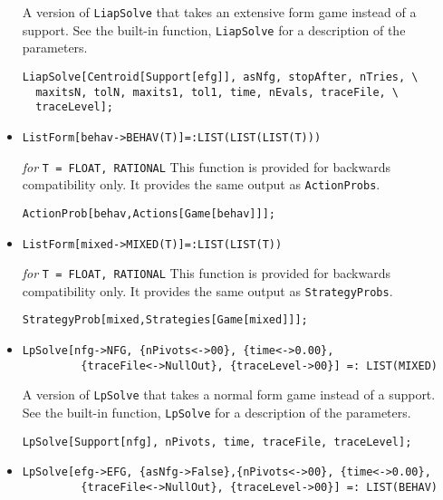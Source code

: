 \begin{itemize}
\bd 
A version of \verb+LiapSolve+ that takes an extensive form
game instead of a support.  See the built-in function,
\verb+LiapSolve+ for a description of the parameters.
\begin{verbatim}
LiapSolve[Centroid[Support[efg]], asNfg, stopAfter, nTries, \
  maxitsN, tolN, maxits1, tol1, time, nEvals, traceFile, \
  traceLevel];
\end{verbatim} 
\ed

\item{}
\protect \large \begin{verbatim}
ListForm[behav->BEHAV(T)]=:LIST(LIST(LIST(T)))
\end{verbatim}\normalsize

{\it for} {\tt T = FLOAT, RATIONAL}
\bd 
This function is provided for backwards compatibility only.  It
provides the same output as \verb+ActionProbs+.
\begin{verbatim}
ActionProb[behav,Actions[Game[behav]]];
\end{verbatim} 
\ed

\item{}
\protect \large \begin{verbatim}
ListForm[mixed->MIXED(T)]=:LIST(LIST(T))
\end{verbatim}\normalsize

{\it for} {\tt T = FLOAT, RATIONAL}
\bd 
This function is provided for backwards compatibility only.  It
provides the same output as \verb+StrategyProbs+.
\begin{verbatim}
StrategyProb[mixed,Strategies[Game[mixed]]];
\end{verbatim} 
\ed

\item{}
\protect \large \begin{verbatim}
LpSolve[nfg->NFG, {nPivots<->00}, {time<->0.00}, 
         {traceFile<->NullOut}, {traceLevel->00}] =: LIST(MIXED)
\end{verbatim}\normalsize

\bd 
A version of \verb+LpSolve+ that takes a normal form
game instead of a support.  See the built-in function,
\verb+LpSolve+ for a description of the parameters.
\begin{verbatim}
LpSolve[Support[nfg], nPivots, time, traceFile, traceLevel];
\end{verbatim} 
\ed

\item{}
\protect \large \begin{verbatim}
LpSolve[efg->EFG, {asNfg->False},{nPivots<->00}, {time<->0.00}, 
         {traceFile<->NullOut}, {traceLevel->00}] =: LIST(BEHAV)
\end{verbatim}\normalsize


\end{itemize}
